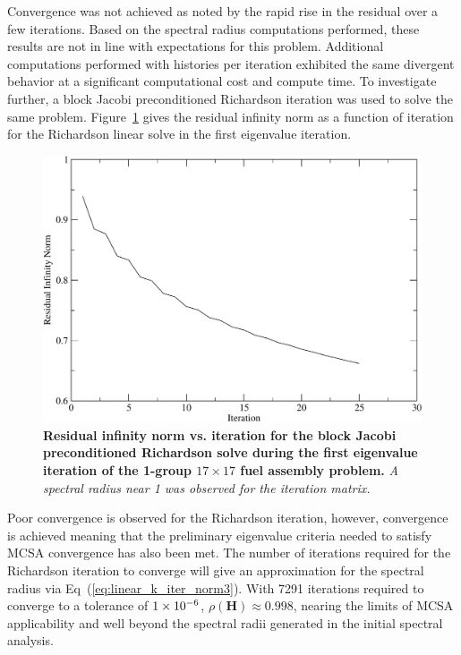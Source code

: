 Convergence was not achieved as noted by the rapid rise in the
residual over a few iterations. Based on the spectral radius
computations performed, these results are not in line with
expectations for this problem. Additional computations performed with
 histories per iteration exhibited the same divergent
behavior at a significant computational cost and compute time. To
investigate further, a block Jacobi preconditioned Richardson
iteration was used to solve the same
problem. Figure~\ref{fig:block_jacobi_res_richardson} gives the
residual infinity norm as a function of iteration for the Richardson
linear solve in the first eigenvalue iteration.

\begin{figure}[t!]
  \begin{center}
    \includegraphics[width=5in]{chapters/spn_equations/block_jacobi_rich_res.pdf}
  \end{center}
  \caption{\textbf{Residual infinity norm vs. iteration for the block
      Jacobi preconditioned Richardson solve during the first
      eigenvalue iteration of the 1-group $17 \times 17$ fuel assembly
      problem.} \textit{A spectral radius near 1 was observed for the
      iteration matrix.}}
  \label{fig:block_jacobi_res_richardson}
\end{figure}

Poor convergence is observed for the Richardson iteration, however,
convergence is achieved meaning that the preliminary eigenvalue
criteria needed to satisfy MCSA convergence has also been met. The
number of iterations required for the Richardson iteration to converge
will give an approximation for the spectral radius via
Eq~(\ref{eq:linear_k_iter_norm3}). With 7291 iterations required to
converge to a tolerance of $1\times 10^{-6}$, $\rho(\mathbf{H}) \approx
0.998$, nearing the limits of MCSA applicability and well beyond the
spectral radii generated in the initial spectral analysis.

